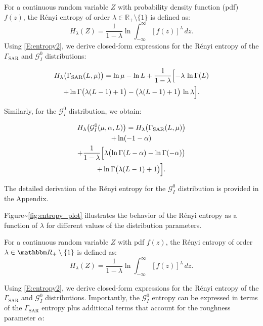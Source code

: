 \documentclass[11pt,]{article}
\begin{document}
For a continuous random variable \(Z\) with probability density function
(pdf) \(f(z)\), the Rényi entropy of order
\(\lambda \in \mathbb{R}_+ \setminus \{1\}\) is defined as:
\begin{equation}
\label{E:entropy2}
H_\lambda(Z) = \frac{1}{1 - \lambda} \ln \int_{-\infty}^{\infty} [f(z)]^\lambda \, dz.
\end{equation} Using \eqref{E:entropy2}, we derive closed-form
expressions for the Rényi entropy of the \(\Gamma_{\mathrm{SAR}}\) and
\(\mathcal{G}^0_I\) distributions:

\begin{multline}
\label{eq-HGammaSAR}
H_\lambda\bigl(\Gamma_{\text{SAR}}(L, \mu)\bigr)
= 
\ln \mu - \ln L + \frac{1}{1-\lambda}
\Bigl[
  -\lambda\,\ln\Gamma(L)  \\ + \ln\Gamma\bigl(\lambda(L-1)+1\bigr)  - \bigl(\lambda(L-1)+1\bigr)\,\ln\lambda
\Bigr].
\end{multline}

Similarly, for the \(\mathcal{G}^0_I\) distribution, we obtain:

\begin{multline}
\label{eq-HGI0}
H_\lambda\bigl(\mathcal{G}^0_I(\mu, \alpha, L)\bigr) = H_\lambda\bigl(\Gamma_{\mathrm{SAR}}(L, \mu)\bigr) \\
+ \ln(-1 - \alpha) \\
+ \frac{1}{1 - \lambda} \Bigl[ 
    \lambda\bigl(\ln\Gamma(L - \alpha) - \ln\Gamma(-\alpha)\bigr) \\
    + \ln\Gamma\bigl(\lambda(L - 1) + 1\bigr) 
\Bigr].
\end{multline}

The detailed derivation of the Rényi entropy for the \(\mathcal{G}^0_I\)
distribution is provided in the Appendix.

Figure\textasciitilde{}\ref{fig:entropy_plot} illustrates the behavior
of the Rényi entropy as a function of \(\lambda\) for different values
of the distribution parameters.

For a continuous random variable \(Z\) with pdf \(f(z)\), the Rényi
entropy of order \(\lambda \in \mathbbm R_+ \setminus \{1\}\) is defined
as: \begin{equation}
\label{E:entropy2}
H_\lambda(Z) = \frac{1}{1 - \lambda} \ln \int_{-\infty}^{\infty} [f(z)]^\lambda \, dz.
\end{equation}

Using \eqref{E:entropy2}, we derive closed-form expressions for the
Rényi entropy of the \(\Gamma_{\mathrm{SAR}}\) and \(\mathcal{G}^0_I\)
distributions. Importantly, the \(\mathcal{G}^0_I\) entropy can be
expressed in terms of the \(\Gamma_{\mathrm{SAR}}\) entropy plus
additional terms that account for the roughness parameter \(\alpha\):
\end{document}
